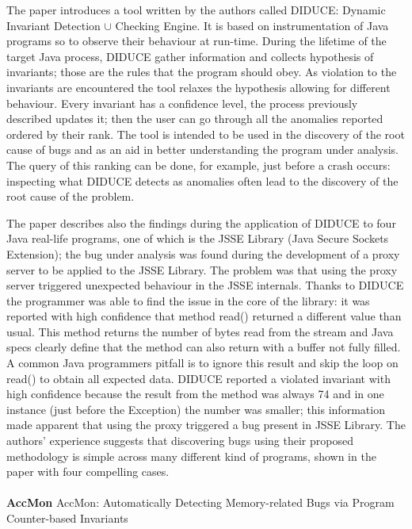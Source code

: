 The paper introduces a tool written by the authors called DIDUCE: Dynamic Invariant Detection $\cup$ Checking Engine.
It is based on instrumentation of Java programs so to observe their behaviour at run-time. During the lifetime of the target Java process, DIDUCE gather information and collects hypothesis of invariants; those are the rules that the program should obey. As violation to the invariants are encountered the tool relaxes the hypothesis allowing for different behaviour. Every invariant has a confidence level, the process previously described updates it; then the user can go through all the anomalies reported ordered by their rank. The tool is intended to be used in the discovery of the root cause of bugs and as an aid in better understanding the program under analysis. 
The query of this ranking can be done, for example, just before a crash occurs: inspecting what DIDUCE detects as anomalies often lead to the discovery of the root cause of the problem.

The paper describes also the findings during the application of DIDUCE to four Java real-life programs, one of which is the JSSE Library (Java Secure Sockets Extension); the bug under analysis was found during the development of a proxy server to be applied to the JSSE Library. The problem was that using the proxy server triggered unexpected behaviour in the JSSE internals. Thanks to DIDUCE the programmer was able to find the issue in the core of the library: it was reported with high confidence that method read() returned a different value than usual. This method returns the number of bytes read from the stream and Java specs clearly define that the method can also return with a buffer not fully filled. A common Java programmers pitfall is to ignore this result and skip the loop on read() to obtain all expected data. DIDUCE reported a violated invariant with high confidence because the result from the method was always 74 and in one instance (just before the Exception) the number was smaller; this information made apparent that using the proxy triggered a bug present in JSSE Library.
The authors' experience suggests that discovering bugs using their proposed methodology is simple across many different kind of programs, shown in the paper with four compelling cases.
\\
\\
\textbf{AccMon} \cite{zhou2004accmon} AccMon: Automatically Detecting Memory-related Bugs via Program Counter-based Invariants

